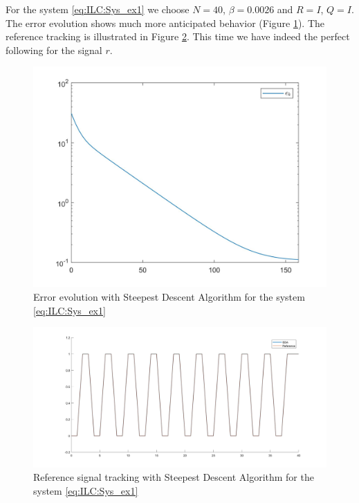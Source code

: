 \begin{exam}
	For the system \eqref{eq:ILC:Sys_ex1} we choose $N = 40$, $\beta = 0.0026$ and $R = I$, $Q = I$. The error evolution shows much more anticipated behavior (Figure \ref{img:ILC:SDA_N40}). The reference tracking is illustrated in Figure \ref{img:ILC:SDA_N40_output}. This time we have indeed the perfect following for the signal $r$. 
	
	\begin{figure}[ht]
		\centering
		\includegraphics[width=\textwidth]{fig/SDA_N40.jpg}
		\caption{Error evolution with Steepest Descent Algorithm for the system \eqref{eq:ILC:Sys_ex1}}
		\label{img:ILC:SDA_N40}
	\end{figure}

	\begin{figure}[ht]
		\centering
	\includegraphics[width=\textwidth]{fig/SDA_N40_output.jpg}
	\caption{Reference signal tracking with Steepest Descent Algorithm for the system \eqref{eq:ILC:Sys_ex1}}
	\label{img:ILC:SDA_N40_output}
\end{figure}
\end{exam}


